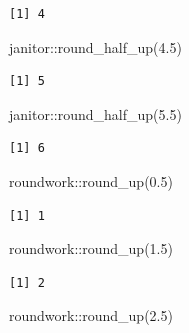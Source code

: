 \documentclass[
  letterpaper,
  DIV=11,
  numbers=noendperiod]{scrreprt}
\newenvironment{Shaded}{\begin{snugshade}}{\end{snugshade}}
\newcommand{\FloatTok}[1]{\textcolor[rgb]{0.68,0.00,0.00}{#1}}
\newcommand{\FunctionTok}[1]{\textcolor[rgb]{0.28,0.35,0.67}{#1}}
\newcommand{\NormalTok}[1]{\textcolor[rgb]{0.00,0.23,0.31}{#1}}
\newcommand{\SpecialCharTok}[1]{\textcolor[rgb]{0.37,0.37,0.37}{#1}}
\begin{document}
\begin{verbatim}
[1] 4
\end{verbatim}

\begin{Shaded}
\begin{Highlighting}[]
\NormalTok{janitor}\SpecialCharTok{::}\FunctionTok{round\_half\_up}\NormalTok{(}\FloatTok{4.5}\NormalTok{)}
\end{Highlighting}
\end{Shaded}

\begin{verbatim}
[1] 5
\end{verbatim}

\begin{Shaded}
\begin{Highlighting}[]
\NormalTok{janitor}\SpecialCharTok{::}\FunctionTok{round\_half\_up}\NormalTok{(}\FloatTok{5.5}\NormalTok{)}
\end{Highlighting}
\end{Shaded}

\begin{verbatim}
[1] 6
\end{verbatim}

\begin{Shaded}
\begin{Highlighting}[]
\NormalTok{roundwork}\SpecialCharTok{::}\FunctionTok{round\_up}\NormalTok{(}\FloatTok{0.5}\NormalTok{)}
\end{Highlighting}
\end{Shaded}

\begin{verbatim}
[1] 1
\end{verbatim}

\begin{Shaded}
\begin{Highlighting}[]
\NormalTok{roundwork}\SpecialCharTok{::}\FunctionTok{round\_up}\NormalTok{(}\FloatTok{1.5}\NormalTok{)}
\end{Highlighting}
\end{Shaded}

\begin{verbatim}
[1] 2
\end{verbatim}

\begin{Shaded}
\begin{Highlighting}[]
\NormalTok{roundwork}\SpecialCharTok{::}\FunctionTok{round\_up}\NormalTok{(}\FloatTok{2.5}\NormalTok{)}
\end{Highlighting}
\end{Shaded}
\end{document}
